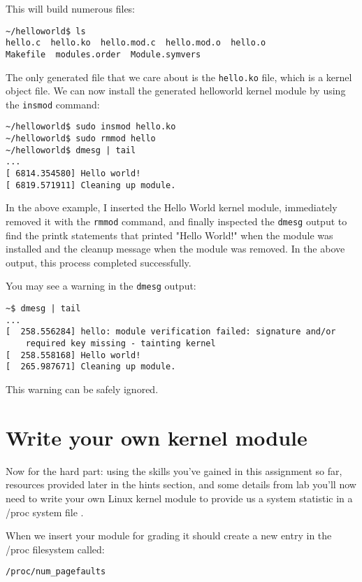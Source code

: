 \documentclass[11pt]{article}
\begin{document}
This will build numerous files:

\begin{verbatim}
~/helloworld$ ls
hello.c  hello.ko  hello.mod.c  hello.mod.o  hello.o  
Makefile  modules.order  Module.symvers
\end{verbatim}

The only generated file that we care about is the \texttt{hello.ko} file, which is a kernel object file. We can now install the generated helloworld kernel module by using the \texttt{insmod} command:

\begin{verbatim}
~/helloworld$ sudo insmod hello.ko
~/helloworld$ sudo rmmod hello
~/helloworld$ dmesg | tail
...
[ 6814.354580] Hello world!
[ 6819.571911] Cleaning up module.
\end{verbatim}

In the above example, I inserted the Hello World kernel module, immediately removed it with the \texttt {rmmod} command, and finally inspected the \texttt{dmesg} output to find the printk statements that printed "Hello World!" when the module was installed and the cleanup message when the module was removed. In the above output, this process completed successfully.

You may see a warning in the \texttt{dmesg} output:

\begin{verbatim}
~$ dmesg | tail
...
[  258.556284] hello: module verification failed: signature and/or  
	required key missing - tainting kernel
[  258.558168] Hello world!
[  265.987671] Cleaning up module.
\end{verbatim}

This warning can be safely ignored.

\section*{Write your own kernel module}

Now for the hard part: using the skills you've gained in this assignment so far, resources provided later in the hints section, and some details from lab you'll now need to write your own Linux kernel module to provide us a system statistic in a /proc system file \cite{cse551}. 

When we insert your module for grading it should create a new entry in the /proc filesystem called:

\begin{verbatim}
/proc/num_pagefaults
\end{verbatim}
\end{document}
